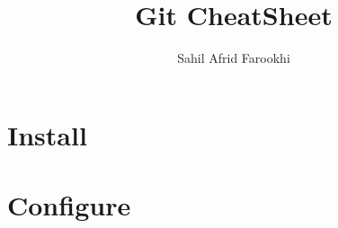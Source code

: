 \documentclass{article}
\title{Git CheatSheet}
\author{Sahil Afrid Farookhi}
\date{}
\begin{document}
\maketitle

\section*{Install}
\section*{Configure}
\end{document}
